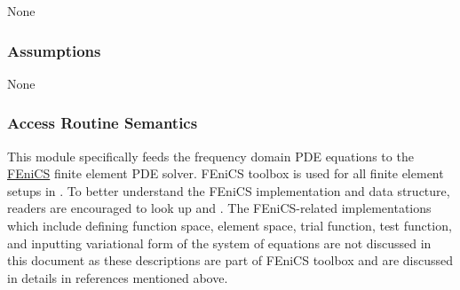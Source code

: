 \documentclass[12pt, titlepage]{article}
\begin{document}
	None
	
	\subsubsection{Assumptions}
	
	None
	
	\subsubsection{Access Routine Semantics}
	
	This module specifically feeds the frequency domain PDE equations to the
	\hyperref{https://fenicsproject.org/}{}{}{FEniCS} finite element PDE solver.
	FEniCS toolbox is used for all finite element setups in \progname{}. To better
	understand the  FEniCS implementation and data structure, readers are
	encouraged to look up \cite{alnaes2015fenics} and \cite{logg2012finite}. The
	FEniCS-related implementations which include defining function space, element
	space, trial function, test function, and inputting variational form of the
	system of equations are not discussed in this document as these descriptions
	are part of FEniCS toolbox and are discussed in details in references mentioned
	above.
	
\end{document}
